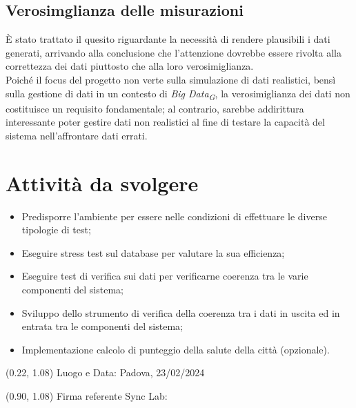 \documentclass{article}
\begin{document}
    \subsection{Verosimglianza delle misurazioni}
    È stato trattato il quesito riguardante la necessità di rendere plausibili i dati generati, arrivando alla conclusione che l'attenzione dovrebbe essere rivolta alla correttezza dei dati piuttosto che alla loro verosimiglianza.\\
    Poiché il focus del progetto non verte sulla simulazione di dati realistici, bensì sulla gestione di dati in un contesto di \textit{Big Data}\textsubscript{\textit{G}}, la verosimiglianza dei dati non costituisce un requisito fondamentale; al contrario, sarebbe addirittura interessante poter gestire dati non realistici al fine di testare la capacità del sistema nell'affrontare dati errati.
\section{Attività da svolgere}
    \begin{itemize}
        \item Predisporre l'ambiente per essere nelle condizioni di effettuare le diverse tipologie di test;
        \item Eseguire stress test sul database per valutare la sua efficienza;
        \item Eseguire test di verifica sui dati per verificarne coerenza tra le varie componenti del sistema;
        \item Sviluppo dello strumento di verifica della coerenza tra i dati in uscita ed in entrata tra le componenti del sistema;
        \item Implementazione calcolo di punteggio della salute della città (opzionale).
    \end{itemize}

\begin{textblock*}{\textwidth}(0.22\textwidth, 1.08\textheight)
    Luogo e Data: Padova, 23/02/2024
\end{textblock*}

\begin{textblock*}{\textwidth}(0.90\textwidth, 1.08\textheight)
        Firma referente Sync Lab:
\end{textblock*}
\end{document}
